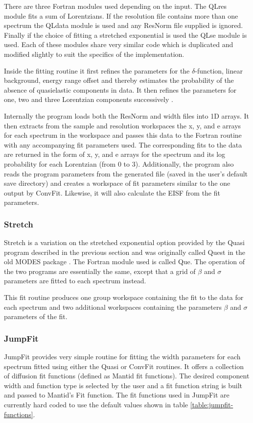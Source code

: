 \documentclass[paper=a4, fontsize=11pt]{scrartcl}	%
\numberwithin{equation}{section}															%
\numberwithin{figure}{section}																%
\numberwithin{table}{section}																%
\begin{document}
There are three Fortran modules used depending on the input. The QLres module fits a sum of Lorentzians. If the resolution file contains more than one spectrum the QLdata module is used and any ResNorm file supplied is ignored. Finally if the choice of fitting a stretched exponential is used the QLse module is used. Each of these modules share very similar code which is duplicated and modified slightly to suit the specifics of the implementation.

Inside the fitting routine it first refines the parameters for the $\delta$-function, linear background, energy range offset and thereby estimates the probability of the absence of quasielastic components in data. It then refines the parameters for one, two and three Lorentzian components successively \citep{dssivia1992}.

Internally the program loads both the ResNorm and width files into 1D arrays. It then extracts from the sample and resolution workspaces the x, y, and e arrays for each spectrum in the workspace and passes this data to the Fortran routine with any accompanying fit parameters used. The corresponding fits to the data are returned in the form of x, y, and e arrays for the spectrum and its log probability for each Lorentzian (from 0 to 3). Additionally, the program also reads the program parameters from the generated file (saved in the user's default save directory) and creates a workspace of fit parameters similar to the one output by ConvFit. Likewise, it will also calculate the EISF from the fit parameters.

\subsubsection{Stretch}
\label{subsec:stretch}
Stretch is a variation on the stretched exponential option provided by the Quasi program described in the previous section and was originally called Quest in the old MODES package \citep{wshowells2010}. The Fortran module used is called Que. The operation of the two programs are essentially the same, except that a grid of $\beta$ and $\sigma$ parameters are fitted to each spectrum instead.

This fit routine produces one group workspace containing the fit to the data for each spectrum and two additional workspaces containing the parameters $\beta$ and $\sigma$ parameters of the fit.

\subsubsection{JumpFit}
\label{subsec:jumpfit}
JumpFit provides very simple routine for fitting the width parameters for each spectrum fitted using either the Quasi or ConvFit routines. It offers a collection of diffusion fit functions (defined as Mantid fit functions). The desired component width and function type is selected by the user and a fit function string is built and passed to Mantid's Fit function. The fit functions used in JumpFit are currently hard coded to use the default values shown in table \ref{table:jumpfit-functions}.
\end{document}
